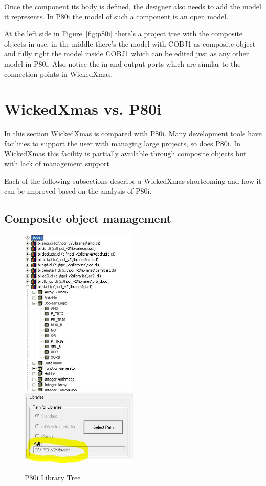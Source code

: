 \documentclass[a4paper,11pt,final]{article}
\begin{document}
Once the component its body is defined, the designer also needs to add the model 
it represents. In P80i the model of such a component is an open model.

At the left side in Figure~\ref{fig:p80i} there's a project tree with the composite objects in use,
in the middle there's the model with COBJ1 as composite object and fully right the model
inside COBJ1 which can be edited just as any other model in P80i. Also
notice the in and output ports which are similar to the connection points
in WickedXmas.


\newpage
\section{WickedXmas vs. P80i}

In this section WickedXmas is compared with P80i.
Many development tools have facilities to support the user with managing
large projects, so does P80i. In WickedXmas this facility is partially available
through composite objects but with lack of management support.

Each of the following subsections describe a WickedXmas shortcoming and
how it can be improved based on the analysis of P80i.

\subsection{Composite object management}

\begin{figure}[here]
\includegraphics[width=0.5\textwidth]{p80i_library.jpg}
\includegraphics[width=0.5\textwidth]{p80i_library_setup.jpg}
\caption{P80i Library Tree}
\label{fig:p80i_library}
\end{figure}
\end{document}
